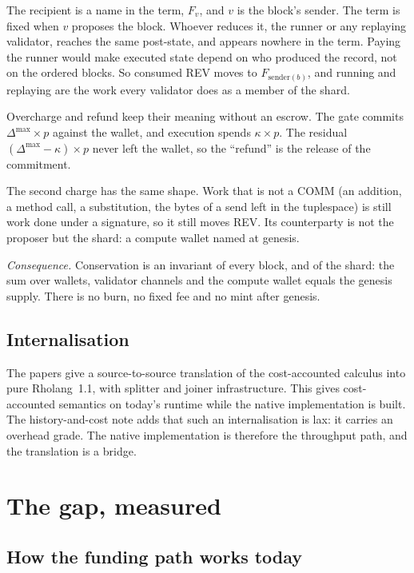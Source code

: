 \documentclass[11pt]{article}
\begin{document}
The recipient is a name in the term, $F_v$, and $v$ is the block's sender. The term is fixed when $v$ proposes the block. Whoever reduces it, the runner or any replaying validator, reaches the same post-state, and appears nowhere in the term. Paying the runner would make executed state depend on who produced the record, not on the ordered blocks. So consumed REV moves to $F_{\mathrm{sender}(b)}$, and running and replaying are the work every validator does as a member of the shard.

Overcharge and refund keep their meaning without an escrow. The gate commits $\Delta^{\max} \times p$ against the wallet, and execution spends $\kappa \times p$. The residual $(\Delta^{\max} - \kappa) \times p$ never left the wallet, so the ``refund'' is the release of the commitment.

The second charge has the same shape. Work that is not a COMM (an addition, a method call, a substitution, the bytes of a send left in the tuplespace) is still work done under a signature, so it still moves REV. Its counterparty is not the proposer but the shard: a compute wallet named at genesis.

\emph{Consequence.} Conservation is an invariant of every block, and of the shard: the sum over wallets, validator channels and the compute wallet equals the genesis supply. There is no burn, no fixed fee and no mint after genesis.

\subsection{Internalisation}

The papers give a source-to-source translation of the cost-accounted calculus into pure Rholang~1.1, with splitter and joiner infrastructure. This gives cost-accounted semantics on today's runtime while the native implementation is built. The history-and-cost note adds that such an internalisation is lax: it carries an overhead grade. The native implementation is therefore the throughput path, and the translation is a bridge.

\section{The gap, measured}\label{sec:measured}

\subsection{How the funding path works today}
\end{document}
